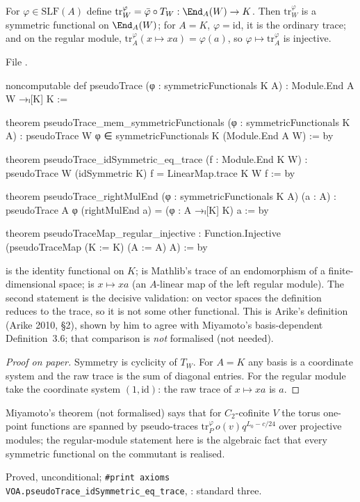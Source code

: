 \begin{theorem}\label{l18:thm:pseudo}
For $\varphi\in\mathrm{SLF}(A)$ define $\mathrm{tr}^\varphi_W=\bar\varphi\circ T_W:\End_A(W)\to K$. Then $\mathrm{tr}^\varphi_W$ is a symmetric
functional on $\End_A(W)$; for $A=K$, $\varphi=\mathrm{id}$, it is the ordinary trace; and on the regular module,
$\mathrm{tr}^\varphi_A(x\mapsto xa)=\varphi(a)$, so $\varphi\mapsto\mathrm{tr}^\varphi_A$ is injective.
\end{theorem}
\noindent File .
\begin{leancode}
noncomputable def pseudoTrace (φ : symmetricFunctionals K A) : Module.End A W →ₗ[K] K :=

theorem pseudoTrace_mem_symmetricFunctionals (φ : symmetricFunctionals K A) :
    pseudoTrace W φ ∈ symmetricFunctionals K (Module.End A W) := by

theorem pseudoTrace_idSymmetric_eq_trace (f : Module.End K W) :
    pseudoTrace W (idSymmetric K) f = LinearMap.trace K W f := by

theorem pseudoTrace_rightMulEnd (φ : symmetricFunctionals K A) (a : A) :
    pseudoTrace A φ (rightMulEnd a) = (φ : A →ₗ[K] K) a := by

theorem pseudoTraceMap_regular_injective :
    Function.Injective (pseudoTraceMap (K := K) (A := A) A) := by
\end{leancode}
\begin{dictionary}
 is the identity functional on $K$;  is Mathlib's trace of an
endomorphism of a finite-dimensional space;  is $x\mapsto xa$ (an $A$-linear map of the left
regular module). The second statement is the decisive validation: on vector spaces the definition reduces to the
trace, so it is not some other functional. This is Arike's definition (Arike 2010, \S2), shown by him to agree with
Miyamoto's basis-dependent Definition~3.6; that comparison is \emph{not} formalised (not needed).
\end{dictionary}
\begin{proof}[Proof on paper]
Symmetry is cyclicity of $T_W$. For $A=K$ any basis is a coordinate system and the raw trace is the sum of diagonal
entries. For the regular module take the coordinate system $(1,\mathrm{id})$: the raw trace of $x\mapsto xa$ is $a$.
\end{proof}
\begin{physics}
Miyamoto's theorem (not formalised) says that for $C_2$-cofinite $V$ the torus one-point functions are spanned by
pseudo-traces $\mathrm{tr}^\varphi_P\,o(v)q^{L_0-c/24}$ over projective modules; the regular-module statement here is the
algebraic fact that every symmetric functional on the commutant is realised.
\end{physics}
\begin{status}
Proved, unconditional; \texttt{\#print axioms VOA.pseudoTrace\_idSymmetric\_eq\_trace},
: standard three.
\end{status}

